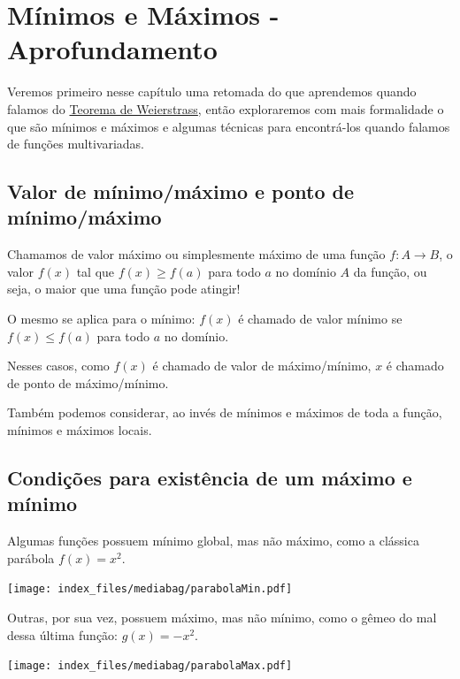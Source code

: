 \documentclass[
  letterpaper,
  DIV=11,
  numbers=noendperiod]{scrreprt}
\begin{document}
\chapter{}\label{section-2}

\chapter{Mínimos e Máximos -
Aprofundamento}\label{muxednimos-e-muxe1ximos---aprofundamento}

Veremos primeiro nesse capítulo uma retomada do que aprendemos quando
falamos do \href{weierstrass.qmd}{Teorema de Weierstrass}, então
exploraremos com mais formalidade o que são mínimos e máximos e algumas
técnicas para encontrá-los quando falamos de funções multivariadas.

\section{Valor de mínimo/máximo e ponto de
mínimo/máximo}\label{valor-de-muxednimomuxe1ximo-e-ponto-de-muxednimomuxe1ximo}

Chamamos de valor máximo ou simplesmente máximo de uma função
\(f: A \rightarrow B\), o valor \(f(x)\) tal que \(f(x) \geq f(a)\) para
todo \(a\) no domínio \(A\) da função, ou seja, o maior que uma função
pode atingir!

O mesmo se aplica para o mínimo: \(f(x)\) é chamado de valor mínimo se
\(f(x) \leq f(a)\) para todo \(a\) no domínio.

Nesses casos, como \(f(x)\) é chamado de valor de máximo/mínimo, \(x\) é
chamado de ponto de máximo/mínimo.

Também podemos considerar, ao invés de mínimos e máximos de toda a
função, mínimos e máximos locais.

\section{Condições para existência de um máximo e
mínimo}\label{condiuxe7uxf5es-para-existuxeancia-de-um-muxe1ximo-e-muxednimo}

Algumas funções possuem mínimo global, mas não máximo, como a clássica
parábola \(f(x) = x^2\).

\texttt{[image: index\_files/mediabag/parabolaMin.pdf]}

Outras, por sua vez, possuem máximo, mas não mínimo, como o gêmeo do mal
dessa última função: \(g(x) = -x^2\).

\texttt{[image: index\_files/mediabag/parabolaMax.pdf]}
\end{document}

